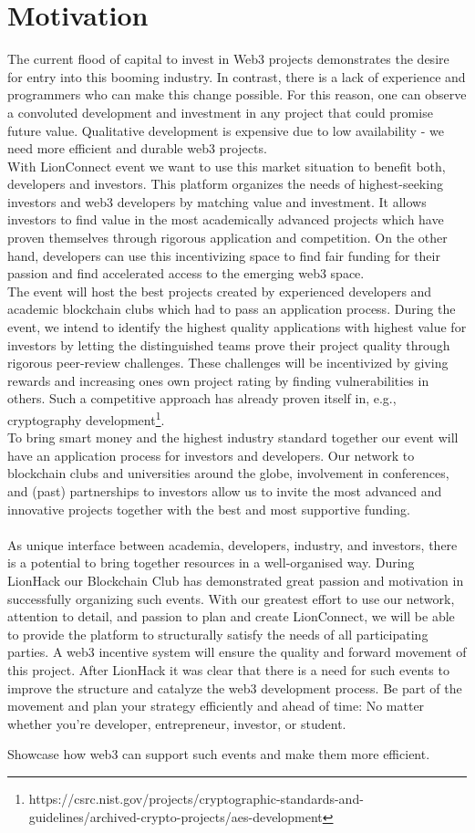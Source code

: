 \section{Motivation}
The current flood of capital to invest in Web3 projects demonstrates the desire for entry into this booming industry. In contrast, there is a lack of experience and programmers who can make this change possible. For this reason, one can observe a convoluted development and investment in any project that could promise future value. Qualitative development is expensive due to low availability - we need more efficient and durable web3 projects. \\
With LionConnect event we want to use this market situation to benefit both, developers and investors. This platform organizes the needs of highest-seeking investors and web3 developers by matching value and investment. It allows investors to find value in the most academically advanced projects which have proven themselves through rigorous application and competition. On the other hand, developers can use this incentivizing space to find fair funding for their passion and find accelerated access to the emerging web3 space. \\
The event will host the best projects created by experienced developers and academic blockchain clubs which had to pass an application process. During the event, we intend to identify the highest quality applications with highest value for investors by letting the distinguished teams prove their project quality through rigorous peer-review challenges. These challenges will be incentivized by giving rewards and increasing ones own project rating by finding vulnerabilities in others. Such a competitive approach has already proven itself in, e.g., cryptography development\footnote{https://csrc.nist.gov/projects/cryptographic-standards-and-guidelines/archived-crypto-projects/aes-development}.\\
To bring smart money and the highest industry standard together our event will have an application process for investors and developers. Our network to blockchain clubs and universities around the globe, involvement in conferences, and (past) partnerships to investors allow us to invite the most advanced and innovative projects together with the best and most supportive funding. 
\\\\
As unique interface between academia, developers, industry, and investors, there is a potential to bring together resources in a well-organised way. During LionHack our Blockchain Club has demonstrated great passion and motivation in successfully organizing such events. With our greatest effort to use our network, attention to detail, and passion to plan and create LionConnect, we will be able to provide the platform to structurally satisfy the needs of all participating parties. A web3 incentive system will ensure the quality and forward movement of this project.
After LionHack it was clear that there is a need for such events to improve the structure and catalyze the web3 development process. Be part of the movement and plan your strategy efficiently and ahead of time: No matter whether you're developer, entrepreneur, investor, or student.

Showcase how web3 can support such events and make them more efficient.